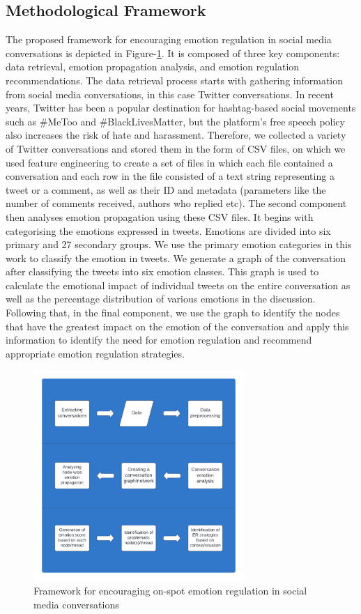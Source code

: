 \documentclass[acmtog]{acmart}
\begin{document}
\subsection{Methodological Framework}
The proposed framework for encouraging emotion regulation in social media conversations is depicted in Figure-\ref{fig:Framework}. It is composed of three key components: data retrieval, emotion propagation analysis, and emotion regulation recommendations. The data retrieval process starts with gathering information from social media conversations, in this case Twitter conversations. In recent years, Twitter has been a popular destination for hashtag-based social movements such as \#MeToo and \#BlackLivesMatter, but the platform's free speech policy also increases the risk of hate and harassment. Therefore, we collected a variety of Twitter conversations and stored them in the form of CSV files, on which we used feature engineering to create a set of files in which each file contained a conversation and each row in the file consisted of a text string representing a tweet or a comment, as well as their ID and metadata (parameters like the number of comments received, authors who replied etc). The second component then analyses emotion propagation using these CSV files. It begins with categorising the emotions expressed in tweets. Emotions are divided into six primary and 27 secondary groups. We use the primary emotion categories in this work to classify the emotion in tweets. We generate a graph of the conversation after classifying the tweets into six emotion classes. This graph is used to calculate the emotional impact of individual tweets on the entire conversation as well as the percentage distribution of various emotions in the discussion. Following that, in the final component, we use the graph to identify the nodes that have the greatest impact on the emotion of the conversation and apply this information to identify the need for emotion regulation and recommend appropriate emotion regulation strategies.
\begin{figure}[h]
  
    \centering
    \includegraphics[width=8cm,height=8cm,keepaspectratio]{framework.pdf}
  \caption{Framework for encouraging on-spot emotion regulation in social media conversations}
  \label{fig:Framework}
  \end{figure}  
\end{document}

